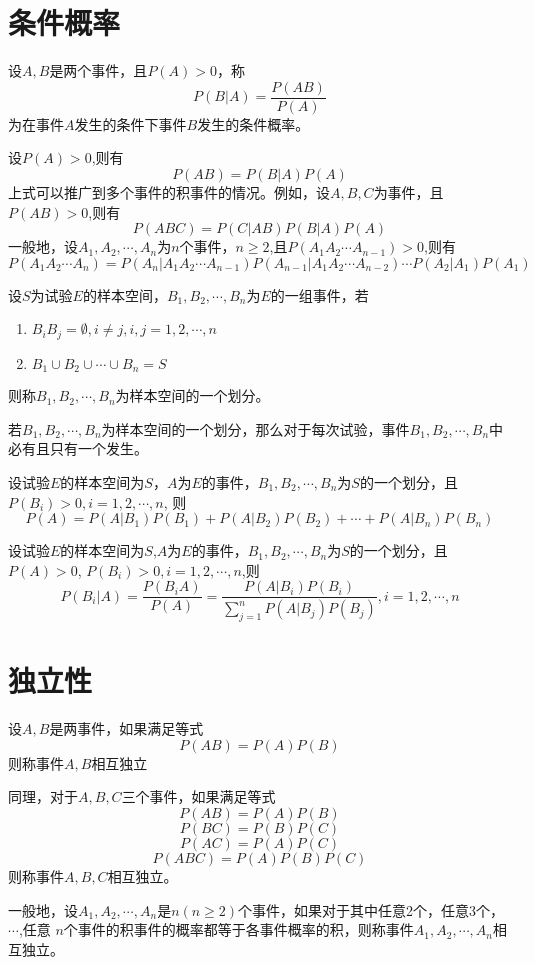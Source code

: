 \section{条件概率}
\begin{definition}[条件概率]
  设$A,B$是两个事件，且$P(A)>0$，称
  $$P(B|A)=\frac{P(AB)}{P(A)}$$
  为在事件$A$发生的条件下事件$B$发生的条件概率。
\end{definition}

\begin{theorem}[乘法定理]
  设$P(A)>0$,则有
  $$P(AB)=P(B|A)P(A)$$
  上式可以推广到多个事件的积事件的情况。例如，设$A,B,C$为事件，且$P(AB)>0$,则有
  $$P(ABC)=P(C|AB)P(B|A)P(A)$$
  一般地，设$A_1,A_2,\cdots,A_n$为$n$个事件，$n\geq 2$,且$P(A_1A_2\cdots A_{n-1})>0$,则有
  $$P(A_1A_2\cdots A_n)=P(A_n|A_1A_2\cdots A_{n-1})P(A_{n-1}|A_1A_2\cdots A_{n-2})\cdots P(A_2|A_1)P(A_1)$$
\end{theorem}

\begin{definition}[样本空间的划分]
  设$S$为试验$E$的样本空间，$B_1,B_2,\cdots,B_n$为$E$的一组事件，若
  \begin{enumerate}
    \item $B_iB_j=\emptyset,i\neq j,i,j=1,2,\cdots,n$
    \item $B_1\cup B_2\cup\cdots\cup B_n=S$
  \end{enumerate}
  则称$B_1,B_2,\cdots,B_n$为样本空间的一个划分。

  若$B_1,B_2,\cdots,B_n$为样本空间的一个划分，那么对于每次试验，事件$B_1,B_2,\cdots,B_n$中必有且只有一个发生。
\end{definition}

\begin{theorem}[全概率公式]
  设试验$E$的样本空间为$S$，$A$为$E$的事件，$B_1,B_2,\cdots,B_n$为$S$的一个划分，且$P(B_i)>0,i=1,2,\cdots,n$,
  则
  $$P(A)=P(A|B_1)P(B_1)+P(A|B_2)P(B_2)+\cdots+P(A|B_n)P(B_n)$$
\end{theorem}

\begin{theorem}
  设试验$E$的样本空间为$S$,$A$为$E$的事件，$B_1,B_2,\cdots,B_n$为$S$的一个划分，且$P(A)>0$,
  $P(B_i)>0,i=1,2,\cdots,n$,则
  $$P(B_i|A)=\frac{P(B_iA)}{P(A)}=\frac{P(A|B_i)P(B_i)}{\sum\limits_{j=1}^{n} P(A|B_j)P(B_j)},i=1,2,\cdots,n$$ 
\end{theorem}

\section{独立性}
\begin{definition}[独立性]
  设$A,B$是两事件，如果满足等式
  $$P(AB)=P(A)P(B)$$
  则称事件$A,B$相互独立

  同理，对于$A,B,C$三个事件，如果满足等式
  $$P(AB)=P(A)P(B)$$
  $$P(BC)=P(B)P(C)$$
  $$P(AC)=P(A)P(C)$$
  $$P(ABC)=P(A)P(B)P(C)$$
  则称事件$A,B,C$相互独立。

  一般地，设$A_1,A_2,\cdots,A_n$是$n(n\geq 2)$个事件，如果对于其中任意2个，任意3个，$\cdots$,任意
  $n$个事件的积事件的概率都等于各事件概率的积，则称事件$A_1,A_2,\cdots,A_n$相互独立。
\end{definition}
